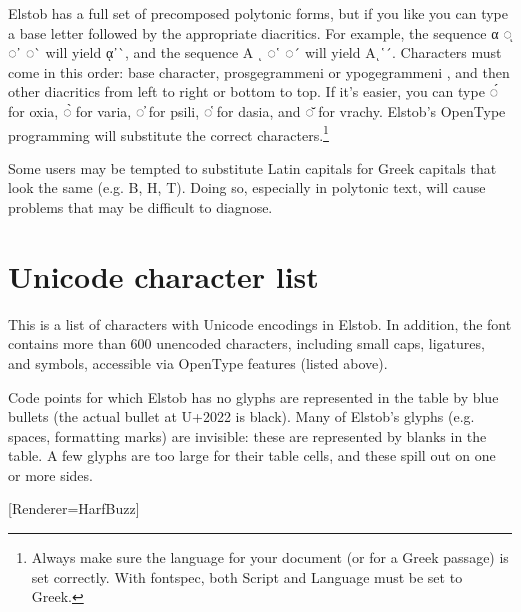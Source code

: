 \documentclass[12pt,letterpaper,openany]{book}
\begin{document}
Elstob has a full set of precomposed polytonic forms, but if you like you can
type a base letter followed by the appropriate diacritics. For example, the sequence
α  ◌ͅ  ◌᾿  ◌`  will yield 
{ᾳ᾿`}, 
and the sequence Α 
ι  ◌῾  ◌´  will yield
{Αι῾´}.
Characters must come in this order:
base character, prosgegrammeni  or ypogegrammeni , and then other
diacritics from left to right or bottom to top.
If it's easier, you can type ◌́  for oxia, ◌̀  for varia,
◌̕  for psili, ◌̔ 
for dasia, and ◌̆  for vrachy. Elstob's OpenType programming
will substitute the correct characters.\footnote{Always make sure the language for
your document (or for a Greek passage) is set correctly. With fontspec, both
Script and Language must be set to Greek.}

Some users may be tempted to substitute Latin capitals for Greek capitals that
look the same (e.g. B, H, T). Doing so, especially in polytonic text, will
cause problems that may be difficult to diagnose.


\chapter{Unicode character list}

This is a list of characters with Unicode encodings in Elstob. In addition, the
font contains more than 600 unencoded characters, including small
caps, ligatures, and symbols, accessible via OpenType features (listed above).

Code points for which Elstob has no glyphs are represented in the table by blue
bullets (the actual bullet at U+2022 is black).
Many of Elstob's glyphs (e.g. spaces, formatting marks) are invisible: these
are represented by blanks in the table. A few glyphs are too large for their table cells,
and these spill out on one or more sides.

[Renderer=HarfBuzz]
\end{document}
